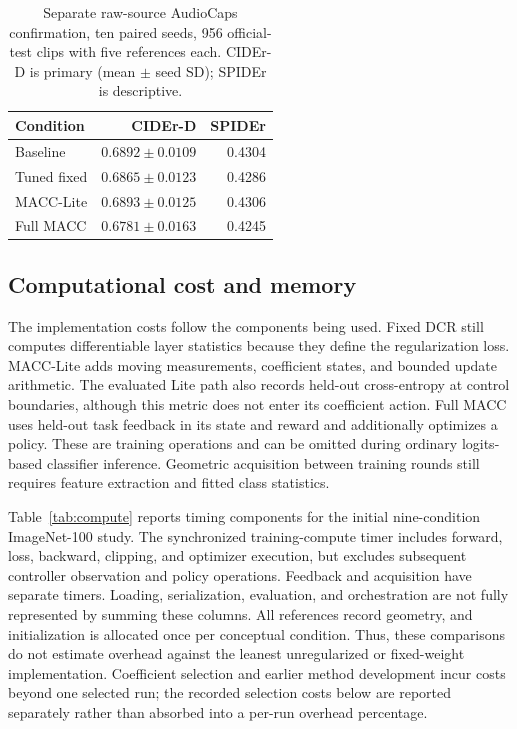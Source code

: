 \documentclass[10pt,a4paper,twocolumn]{article}
\begin{document}
\begin{table}[tbp]
\caption{Separate raw-source AudioCaps confirmation, ten paired seeds, 956 official-test clips with five references each. CIDEr-D is primary (mean $\pm$ seed SD); SPIDEr is descriptive.}
\label{tab:raw_audio_final}
\centering\footnotesize
\begin{tabularx}{\linewidth}{@{}Yrr@{}}
\toprule
Condition & CIDEr-D & SPIDEr \\
\midrule
Baseline & $0.6892\pm0.0109$ & 0.4304 \\
Tuned fixed & $0.6865\pm0.0123$ & 0.4286 \\
MACC-Lite & $0.6893\pm0.0125$ & 0.4306 \\
Full MACC & $0.6781\pm0.0163$ & 0.4245 \\
\bottomrule
\end{tabularx}
\end{table}
\subsection{Computational cost and memory}
\label{sec:overhead}

The implementation costs follow the components being used. Fixed DCR
still computes differentiable layer statistics because they define the
regularization loss. MACC-Lite adds moving measurements, coefficient
states, and bounded update arithmetic. The evaluated Lite path also
records held-out cross-entropy at control boundaries, although this
metric does not enter its coefficient action. Full MACC uses held-out
task feedback in its state and reward and additionally optimizes a
policy. These are training operations and can be omitted during ordinary
logits-based classifier inference. Geometric acquisition between training
rounds still requires feature extraction and fitted class statistics.

Table~\ref{tab:compute} reports timing components for the initial
nine-condition ImageNet-100 study.
The synchronized training-compute timer includes forward,
loss, backward, clipping, and optimizer execution, but excludes
subsequent controller observation and policy operations.
Feedback and acquisition have separate timers.
Loading, serialization, evaluation, and orchestration are not
fully represented by summing these columns.
All references record geometry, and initialization is allocated
once per conceptual condition. Thus, these comparisons do not estimate
overhead against the leanest unregularized or fixed-weight implementation.
Coefficient selection and earlier method development incur costs beyond
one selected run; the recorded selection costs below are reported
separately rather than absorbed into a per-run overhead percentage.
\end{document}

